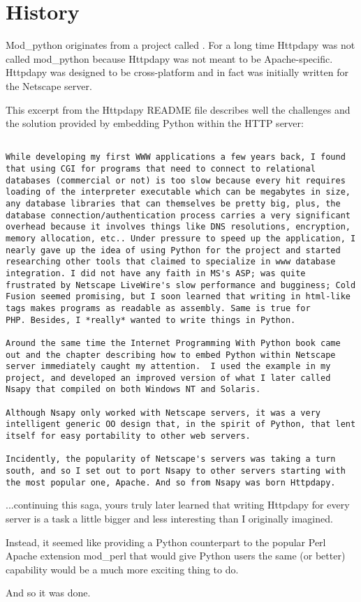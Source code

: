 \section{History\label{intr-history}}

Mod_python originates from a project called
. For
a long time Httpdapy was not called mod_python because Httpdapy was
not meant to be Apache-specific. Httpdapy was designed to be
cross-platform and in fact was initially written for the Netscape
server.

This excerpt from the Httpdapy README file describes well the
challenges and the solution provided by embedding Python within the
HTTP server:

\begin{verbatim}

While developing my first WWW applications a few years back, I found
that using CGI for programs that need to connect to relational
databases (commercial or not) is too slow because every hit requires
loading of the interpreter executable which can be megabytes in size,
any database libraries that can themselves be pretty big, plus, the
database connection/authentication process carries a very significant
overhead because it involves things like DNS resolutions, encryption,
memory allocation, etc.. Under pressure to speed up the application, I
nearly gave up the idea of using Python for the project and started
researching other tools that claimed to specialize in www database
integration. I did not have any faith in MS's ASP; was quite
frustrated by Netscape LiveWire's slow performance and bugginess; Cold
Fusion seemed promising, but I soon learned that writing in html-like
tags makes programs as readable as assembly. Same is true for
PHP. Besides, I *really* wanted to write things in Python.

Around the same time the Internet Programming With Python book came
out and the chapter describing how to embed Python within Netscape
server immediately caught my attention.  I used the example in my
project, and developed an improved version of what I later called
Nsapy that compiled on both Windows NT and Solaris.

Although Nsapy only worked with Netscape servers, it was a very
intelligent generic OO design that, in the spirit of Python, that lent
itself for easy portability to other web servers.

Incidently, the popularity of Netscape's servers was taking a turn
south, and so I set out to port Nsapy to other servers starting with
the most popular one, Apache. And so from Nsapy was born Httpdapy.

\end{verbatim}

...continuing this saga, yours truly later learned that writing Httpdapy for
every server is a task a little bigger and less interesting than I
originally imagined.

Instead, it seemed like providing a Python counterpart to the popular
Perl Apache extension mod_perl that would give Python users the same
(or better) capability would be a much more exciting thing to do.

And so it was done. 

